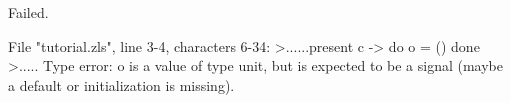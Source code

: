 \chklistingfalse
{}
\begin{ChkListingMsg}
Failed.
\end{ChkListingMsg}
\begin{ChkListingErr}
File "tutorial.zls", line 3-4, characters 6-34:
>......present c -> do o = () done
>.....
Type error: o is a value of type
unit,
but is expected to be a signal (maybe a default or initialization is missing).
\end{ChkListingErr}
